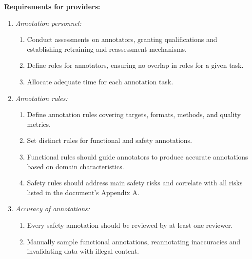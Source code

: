 \documentclass{article}
\begin{document}
\textbf{Requirements for providers:}
\begin{enumerate}
    \item \textit{Annotation personnel:}
    \begin{enumerate}
        \item Conduct assessments on annotators, granting qualifications and establishing retraining and reassessment mechanisms.
        \item Define roles for annotators, ensuring no overlap in roles for a given task.
        \item Allocate adequate time for each annotation task.
    \end{enumerate}
    \item \textit{Annotation rules:}
    \begin{enumerate}
        \item Define annotation rules covering targets, formats, methods, and quality metrics.
        \item Set distinct rules for functional and safety annotations.
        \item Functional rules should guide annotators to produce accurate annotations based on domain characteristics.
        \item Safety rules should address main safety risks and correlate with all risks listed in the document's Appendix A.
    \end{enumerate}
    \item \textit{Accuracy of annotations:}
    \begin{enumerate}
        \item Every safety annotation should be reviewed by at least one reviewer.
        \item Manually sample functional annotations, reannotating inaccuracies and invalidating data with illegal content.
    \end{enumerate}
\end{enumerate}
\end{document}

